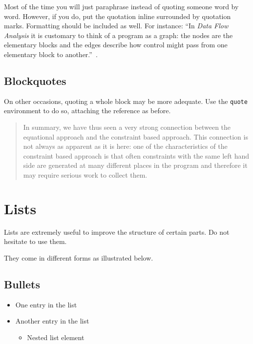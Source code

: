 Most of the time you will just paraphrase instead of quoting someone word by word.
However, if you do, put the quotation inline surrounded by quotation marks.
Formatting should be included as well.
For instance: ``In \emph{Data Flow Analysis} it is customary to think of a program as a graph: the nodes are the elementary blocks and the edges describe how control might pass from one elementary block to another.''~\cite[p.~5]{Nielson:ppa}.

\subsection{Blockquotes}

On other occasions, quoting a whole block may be more adequate.
Use the \texttt{quote} environment to do so, attaching the reference as before.

\begin{quote}
	In summary, we have thus seen a very strong connection between the equational approach and the constraint based approach.
	This connection is not always as apparent as it is here: one of the characteristics of the constraint based approach is that often constraints with the same left hand side are generated at many different places in the program and therefore it may require serious work to collect them.~\cite[p.~10]{Nielson:ppa}
\end{quote}

\section{Lists}

Lists are extremely useful to improve the structure of certain parts.
Do not hesitate to use them.

They come in different forms as illustrated below.

\subsection{Bullets}

\begin{itemize}
	\item One entry in the list
	\item Another entry in the list
	      \begin{itemize}
		      \item Nested list element
	      \end{itemize}
\end{itemize}

